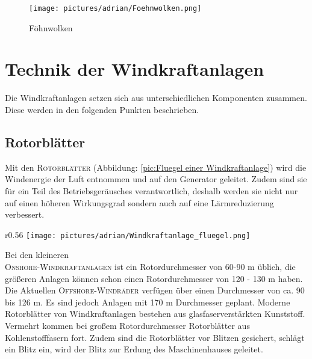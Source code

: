\documentclass[12pt]{scrbook}
\begin{document}
 \vspace{1.6cm}
 \begin{figure}[htbp] 
  \centering
     \texttt{[image: pictures/adrian/Foehnwolken.png]}
  \caption{Föhnwolken}
  \label{pic:Foehnwolken}
\end{figure}
 
 \newpage

\section{Technik der Windkraftanlagen}


Die Windkraftanlagen setzen sich aus unterschiedlichen Komponenten zusammen. Diese werden in den folgenden 
Punkten beschrieben. 

\subsection{Rotorblätter}

 Mit den \textsc{Rotorblätter} (Abbildung: \ref{pic:Fluegel einer Windkraftanlage}) wird die Windenergie der Luft entnommen und auf den
 Generator geleitet. Zudem sind sie für ein Teil des Betriebsgeräusches
 verantwortlich, deshalb werden sie nicht nur auf einen höheren Wirkungsgrad
 sondern auch auf eine Lärmreduzierung verbessert. 
 
 \begin{wrapfigure}[16]{r}{0.56\textwidth}
 	\vspace{-20pt}
	\centering
    \texttt{[image: pictures/adrian/Windkraftanlage\_fluegel.png]}
  	\caption{Flügel einer Windkraftanlage}
  	\label{pic:Fluegel einer Windkraftanlage}
\end{wrapfigure}
 Bei den kleineren \\
 \textsc{Onshore-Windkraftanlagen} ist ein Rotordurchmesser von 60-90 m üblich, die
 größeren Anlagen können schon einen Rotordurchmesser von 120 - 130 m haben.
 Die Aktuellen \textsc{Offshore-Windräder} verfügen über einen Durchmesser von ca. 90
 bis 126 m. Es sind jedoch Anlagen mit 170 m Durchmesser geplant. Moderne
 Rotorblätter von Windkraftanlagen bestehen aus glasfaserverstärkten
 Kunststoff. Vermehrt kommen bei großem Rotordurchmesser Rotorblätter aus \\
 Kohlenstofffasern fort. Zudem sind die Rotorblätter vor Blitzen gesichert,
 schlägt ein Blitz ein, wird der Blitz zur Erdung des Maschinenhauses
 geleitet.
\end{document}
